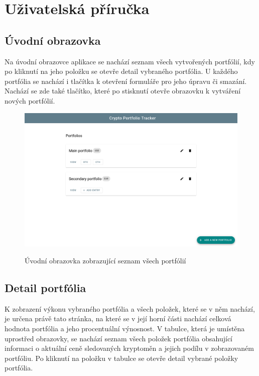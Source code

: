 \documentclass[12pt, a4paper]{article}
\begin{document}
    \section{Uživatelská příručka}
    
    \subsection{Úvodní obrazovka}
    Na úvodní obrazovce aplikace se nachází seznam všech vytvořených portfólií, kdy po kliknutí na jeho položku se otevře detail vybraného portfólia.
    U každého portfólia se nachází i tlačítka k otevření formuláře pro jeho úpravu či smazání.
    Nachází se zde také tlačítko, které po stisknutí otevře obrazovku k vytváření nových portfólií.

    \begin{figure}[!ht]
        \centering
        {\includegraphics[width=\textwidth]{img/cpt-screenshots/portfolio-list.png}}
        \caption{Úvodní obrazovka zobrazující seznam všech portfólií}
        \label{fig:portfolio-list}
    \end{figure}

    \subsection{Detail portfólia}
    K zobrazení výkonu vybraného portfólia a všech položek, které se v něm nachází, je určena právě tato stránka,
    na které se v její horní části nachází celková hodnota portfólia a jeho procentuální výnosnost.
    V tabulce, která je umístěna uprostřed obrazovky, se nachází seznam všech položek portfólia obsahující informaci o
    aktuální ceně sledovaných kryptoměn a jejich podílu v zobrazovaném portfóliu.
    Po kliknutí na položku v tabulce se otevře detail vybrané položky portfólia.
\end{document}
